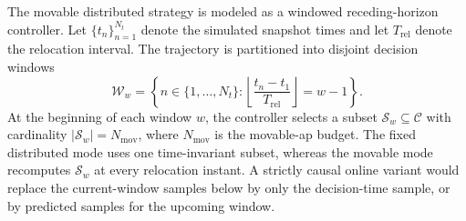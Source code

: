 The movable distributed strategy is modeled as a windowed receding-horizon controller. Let $\{t_n\}_{n=1}^{N_t}$ denote the simulated snapshot times and let $T_{\mathrm{rel}}$ denote the relocation interval. The trajectory is partitioned into disjoint decision windows
\begin{equation}
    \mathcal{W}_w = \left\{n \in \{1,\ldots,N_t\} :
    \left\lfloor \frac{t_n-t_1}{T_{\mathrm{rel}}}\right\rfloor = w-1\right\}.
\end{equation}
At the beginning of each window $w$, the controller selects a subset $\mathcal{S}_w \subseteq \mathcal{C}$ with cardinality $\lvert \mathcal{S}_w \rvert = N_{\mathrm{mov}}$, where $N_{\mathrm{mov}}$ is the movable-\gls{ap} budget. The fixed distributed mode uses one time-invariant subset, whereas the movable mode recomputes $\mathcal{S}_w$ at every relocation instant. A strictly causal online variant would replace the current-window samples below by only the decision-time sample, or by predicted samples for the upcoming window.

